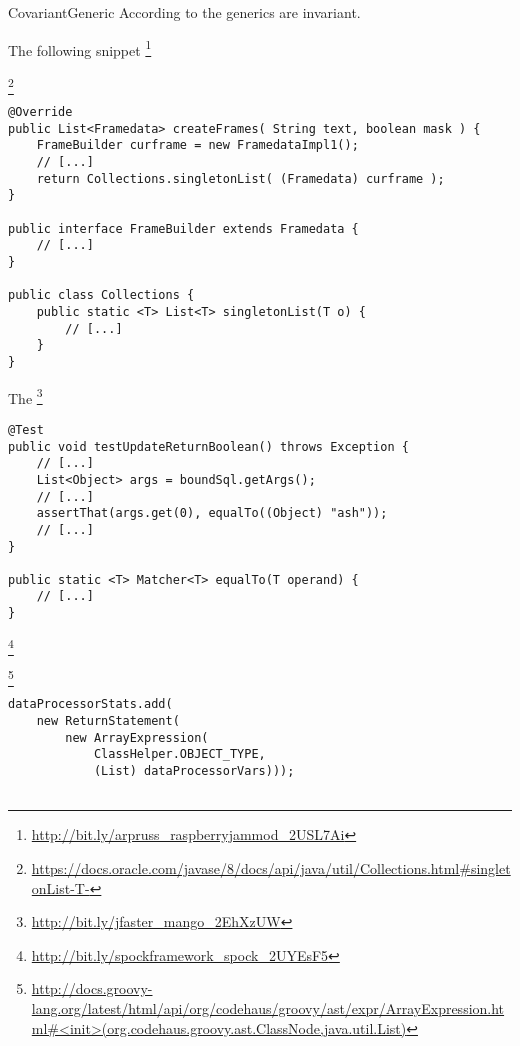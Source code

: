 \begin{pattern}{CovariantGeneric}
According to the generics are invariant.

\instances{}
The following snippet%
\footnote{\url{http://bit.ly/arpruss_raspberryjammod_2USL7Ai}}


\footnote{\url{https://docs.oracle.com/javase/8/docs/api/java/util/Collections.html\#singletonList-T-}}

\begin{verbatim}
@Override
public List<Framedata> createFrames( String text, boolean mask ) {
    FrameBuilder curframe = new FramedataImpl1();
    // [...]
    return Collections.singletonList( (Framedata) curframe );
}

public interface FrameBuilder extends Framedata {
    // [...]
}

public class Collections {
    public static <T> List<T> singletonList(T o) {
        // [...]
    }
}
\end{verbatim}

The 
\footnote{\url{http://bit.ly/jfaster_mango_2EhXzUW}}

\begin{verbatim}
@Test
public void testUpdateReturnBoolean() throws Exception {
    // [...]
    List<Object> args = boundSql.getArgs();
    // [...]
    assertThat(args.get(0), equalTo((Object) "ash"));
    // [...]
}

public static <T> Matcher<T> equalTo(T operand) {
    // [...]
}
\end{verbatim}


\footnote{\url{http://bit.ly/spockframework_spock_2UYEsF5}}

\footnote{\url{http://docs.groovy-lang.org/latest/html/api/org/codehaus/groovy/ast/expr/ArrayExpression.html\#<init>(org.codehaus.groovy.ast.ClassNode,java.util.List)}}

\begin{verbatim}
dataProcessorStats.add(
    new ReturnStatement(
        new ArrayExpression(
            ClassHelper.OBJECT_TYPE,
            (List) dataProcessorVars)));


\end{verbatim}
\end{pattern}
